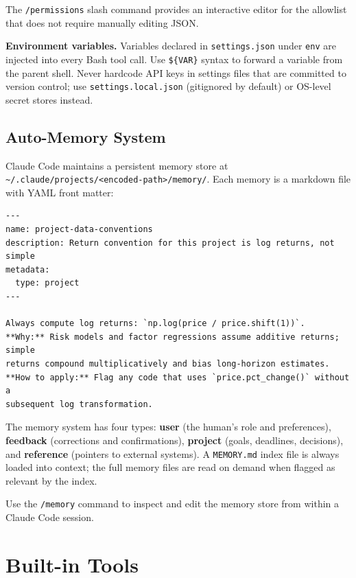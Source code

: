 The \texttt{/permissions} slash command provides an interactive editor for the
allowlist that does not require manually editing JSON.

\textbf{Environment variables.}  Variables declared in \texttt{settings.json}
under \texttt{env} are injected into every Bash tool call.  Use
\texttt{\$\{VAR\}} syntax to forward a variable from the parent shell.  Never
hardcode API keys in settings files that are committed to version control; use
\texttt{settings.local.json} (gitignored by default) or OS-level secret stores
instead.

\subsection{Auto-Memory System}
\label{app:claude-code:memory}

Claude Code maintains a persistent memory store at
\texttt{\textasciitilde/.claude/projects/\textless{}encoded-path\textgreater/memory/}.
Each memory is a markdown file with YAML front matter:

\begin{verbatim}
---
name: project-data-conventions
description: Return convention for this project is log returns, not simple
metadata:
  type: project
---

Always compute log returns: `np.log(price / price.shift(1))`.
**Why:** Risk models and factor regressions assume additive returns; simple
returns compound multiplicatively and bias long-horizon estimates.
**How to apply:** Flag any code that uses `price.pct_change()` without a
subsequent log transformation.
\end{verbatim}

The memory system has four types: \textbf{user} (the human's role and
preferences), \textbf{feedback} (corrections and confirmations), \textbf{project}
(goals, deadlines, decisions), and \textbf{reference} (pointers to external
systems).  A \texttt{MEMORY.md} index file is always loaded into context; the
full memory files are read on demand when flagged as relevant by the index.

Use the \texttt{/memory} command to inspect and edit the memory store from
within a Claude Code session.

\section{Built-in Tools}
\label{app:claude-code:tools}

